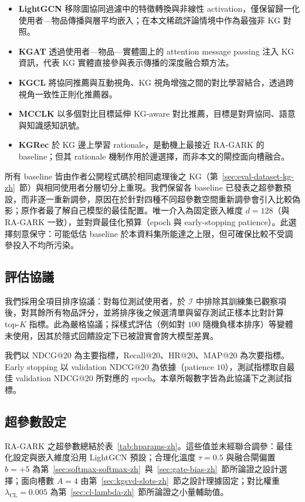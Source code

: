 \begin{itemize}
  \item \textbf{LightGCN} 移除圖協同過濾中的特徵轉換與非線性 activation，僅保留歸一化使用者—物品傳播與層平均嵌入；在本文稀疏評論情境中作為最強非 KG 對照。
  \item \textbf{KGAT} 透過使用者—物品—實體圖上的 attention message passing 注入 KG 資訊，代表 KG 實體直接參與表示傳播的深度融合類方法。
  \item \textbf{KGCL} 將協同推薦與互動視角、KG 視角增強之間的對比學習結合，透過跨視角一致性正則化推薦器。
  \item \textbf{MCCLK} 以多個對比目標延伸 KG-aware 對比推薦，目標是對齊協同、語意與知識感知訊號。
  \item \textbf{KGRec} 於 KG 邊上學習 rationale，是動機上最接近 RA-GARK 的 baseline；但其 rationale 機制作用於邊選擇，而非本文的閘控面向槽融合。
\end{itemize}

所有 baseline 皆由作者公開程式碼於相同處理後之 KG（第~\ref{sec:eval-dataset-kg-zh}~節）與相同使用者分層切分上重現。我們保留各 baseline 已發表之超參數預設，而非逐一重新調參，原因在於針對四種不同超參數空間重新調參會引入比較偽影；原作者最了解自己模型的最佳配置。唯一介入為固定嵌入維度 $d = 128$（與 RA-GARK 一致），並對齊最佳化預算（epoch 與 early-stopping patience）。此選擇刻意保守：可能低估 baseline 於本資料集所能達之上限，但可確保比較不受調參投入不均所污染。

\subsection{評估協議}
\label{sec:eval-protocol-zh}

我們採用全項目排序協議：對每位測試使用者，於 $\mathcal{I}$ 中排除其訓練集已觀察項後，對其餘所有物品評分，並將排序後之候選清單與留存測試正樣本比對計算 top-$K$ 指標。此為嚴格協議；採樣式評估（例如對 $100$ 隨機負樣本排序）等變體未使用，因其於隱式回饋設定下已被證實會誇大模型差異。

我們以 NDCG@$20$ 為主要指標，Recall@$20$、HR@$20$、MAP@$20$ 為次要指標。Early stopping 以 validation NDCG@$20$ 為依據（patience $10$），測試指標取自最佳 validation NDCG@$20$ 所對應的 epoch。本章所報數字皆為此協議下之測試指標。

\subsection{超參數設定}
\label{sec:eval-hparams-zh}

RA-GARK 之超參數總結於表~\ref{tab:hparams-zh}。這些值並未經聯合調參：最佳化設定與嵌入維度沿用 LightGCN 預設；合理化溫度 $\tau = 0.5$ 與融合閘偏置 $b = +5$ 為第~\ref{sec:softmax-softmax-zh}~與~\ref{sec:gate-bias-zh}~節所論證之設計選擇；面向槽數 $A = 4$ 由第~\ref{sec:kgsvd-slots-zh}~節之設計理據固定；對比權重 $\lambda_{\mathrm{CL}} = 0.005$ 為第~\ref{sec:cl-lambda-zh}~節所論證之小量輔助值。

